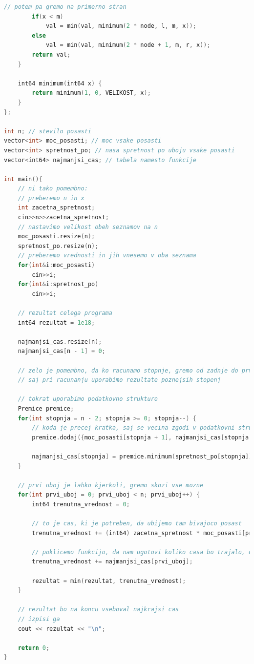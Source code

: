\begin{lstlisting}[label={lst:code5}, language=C++]
        // potem pa gremo na primerno stran
        if(x < m)
            val = min(val, minimum(2 * node, l, m, x));
        else
            val = min(val, minimum(2 * node + 1, m, r, x));
        return val;
    }

    int64 minimum(int64 x) {
        return minimum(1, 0, VELIKOST, x);
    }
};

int n; // stevilo posasti
vector<int> moc_posasti; // moc vsake posasti
vector<int> spretnost_po; // nasa spretnost po uboju vsake posasti
vector<int64> najmanjsi_cas; // tabela namesto funkcije

int main(){
    // ni tako pomembno:
    // preberemo n in x
    int zacetna_spretnost;
    cin>>n>>zacetna_spretnost;
    // nastavimo velikost obeh seznamov na n
    moc_posasti.resize(n);
    spretnost_po.resize(n);
    // preberemo vrednosti in jih vnesemo v oba seznama
    for(int&i:moc_posasti)
        cin>>i;
    for(int&i:spretnost_po)
        cin>>i;

    // rezultat celega programa
    int64 rezultat = 1e18;

    najmanjsi_cas.resize(n);
    najmanjsi_cas[n - 1] = 0;

    // zelo je pomembno, da ko racunamo stopnje, gremo od zadnje do prve,
    // saj pri racunanju uporabimo rezultate poznejsih stopenj

    // tokrat uporabimo podatkovno strukturo
    Premice premice;
    for(int stopnja = n - 2; stopnja >= 0; stopnja--) {
        // koda je precej kratka, saj se vecina zgodi v podatkovni strukturi Premice
        premice.dodaj({moc_posasti[stopnja + 1], najmanjsi_cas[stopnja + 1]});

        najmanjsi_cas[stopnja] = premice.minimum(spretnost_po[stopnja]);
    }

    // prvi uboj je lahko kjerkoli, gremo skozi vse mozne
    for(int prvi_uboj = 0; prvi_uboj < n; prvi_uboj++) {
        int64 trenutna_vrednost = 0;

        // to je cas, ki je potreben, da ubijemo tam bivajoco posast
        trenutna_vrednost += (int64) zacetna_spretnost * moc_posasti[prvi_uboj];

        // poklicemo funkcijo, da nam ugotovi koliko casa bo trajalo, da pridemo do konca
        trenutna_vrednost += najmanjsi_cas[prvi_uboj];

        rezultat = min(rezultat, trenutna_vrednost);
    }

    // rezultat bo na koncu vseboval najkrajsi cas
    // izpisi ga
    cout << rezultat << "\n";

    return 0;
}
\end{lstlisting}